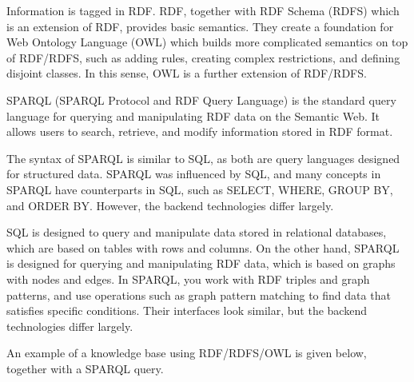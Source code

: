 Information is tagged in RDF. RDF, together with RDF Schema (RDFS) which is an extension of RDF, provides basic semantics. They create a foundation for Web Ontology Language (OWL) which builds more complicated semantics on top of RDF/RDFS, such as adding rules, creating complex restrictions, and defining disjoint classes. In this sense, OWL is a further extension of RDF/RDFS.

SPARQL (SPARQL Protocol and RDF Query Language) is the standard query language for querying and manipulating RDF data on the Semantic Web. It allows users to search, retrieve, and modify information stored in RDF format.

The syntax of SPARQL is similar to SQL, as both are query languages designed for structured data. SPARQL was influenced by SQL, and many concepts in SPARQL have counterparts in SQL, such as SELECT, WHERE, GROUP BY, and ORDER BY. However, the backend technologies differ largely.

SQL is designed to query and manipulate data stored in relational databases, which are based on tables with rows and columns. On the other hand, SPARQL is designed for querying and manipulating RDF data, which is based on graphs with nodes and edges. In SPARQL, you work with RDF triples and graph patterns, and use operations such as graph pattern matching to find data that satisfies specific conditions. Their interfaces look similar, but the backend technologies differ largely.

An example of a knowledge base using RDF/RDFS/OWL is given below, together with a SPARQL query.

